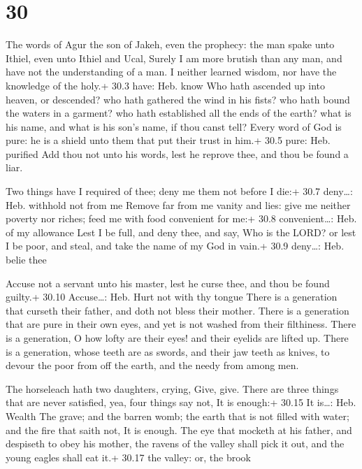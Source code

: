 \hypertarget{section-29}{%
\section{30}\label{section-29}}

 The words of Agur the son of Jakeh, even the prophecy: the
man spake unto Ithiel, even unto Ithiel and Ucal,  Surely I
am more brutish than any man, and have not the understanding of a man.
 I neither learned wisdom, nor have the knowledge of the
holy.+ 30.3 have: Heb. know  Who hath ascended up into
heaven, or descended? who hath gathered the wind in his fists? who hath
bound the waters in a garment? who hath established all the ends of the
earth? what is his name, and what is his son's name, if thou canst tell?
 Every word of God is pure: he is a shield unto them that
put their trust in him.+ 30.5 pure: Heb. purified  Add thou
not unto his words, lest he reprove thee, and thou be found a liar.

 Two things have I required of thee; deny me them not before
I die:+ 30.7 deny\ldots: Heb. withhold not from me  Remove
far from me vanity and lies: give me neither poverty nor riches; feed me
with food convenient for me:+ 30.8 convenient\ldots: Heb. of my
allowance  Lest I be full, and deny thee, and say, Who is
the LORD? or lest I be poor, and steal, and take the name of my God in
vain.+ 30.9 deny\ldots: Heb. belie thee

 Accuse not a servant unto his master, lest he curse thee,
and thou be found guilty.+ 30.10 Accuse\ldots: Heb. Hurt not with thy
tongue  There is a generation that curseth their father,
and doth not bless their mother.  There is a generation
that are pure in their own eyes, and yet is not washed from their
filthiness.  There is a generation, O how lofty are their
eyes! and their eyelids are lifted up.  There is a
generation, whose teeth are as swords, and their jaw teeth as knives, to
devour the poor from off the earth, and the needy from among men.

 The horseleach hath two daughters, crying, Give, give.
There are three things that are never satisfied, yea, four things say
not, It is enough:+ 30.15 It is\ldots: Heb. Wealth  The
grave; and the barren womb; the earth that is not filled with water; and
the fire that saith not, It is enough.  The eye that
mocketh at his father, and despiseth to obey his mother, the ravens of
the valley shall pick it out, and the young eagles shall eat it.+ 30.17
the valley: or, the brook

